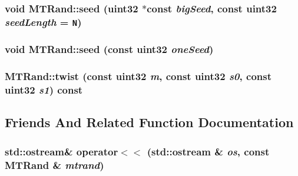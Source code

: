 \begin{CompactItemize}
\begin{CompactItemize}
\hypertarget{classMTRand_5758103776b131e8ea46b6dc1b9fb267}{
\subsubsection[{seed}]{\setlength{\rightskip}{0pt plus 5cm}void MTRand::seed ({\bf uint32} $\ast$const  {\em bigSeed}, \/  const {\bf uint32} {\em seedLength} = {\tt N})}}
\label{classMTRand_5758103776b131e8ea46b6dc1b9fb267}


\hypertarget{classMTRand_1e21a79e0a30225fffe924229e34a923}{
\subsubsection[{seed}]{\setlength{\rightskip}{0pt plus 5cm}void MTRand::seed (const {\bf uint32} {\em oneSeed})}}
\label{classMTRand_1e21a79e0a30225fffe924229e34a923}


\hypertarget{classMTRand_cf32530212717166e3d02dd3cc0b68c4}{
\subsubsection[{twist}]{ MTRand::twist (const {\bf uint32} {\em m}, \/  const {\bf uint32} {\em s0}, \/  const {\bf uint32} {\em s1}) const}}
\label{classMTRand_cf32530212717166e3d02dd3cc0b68c4}




\subsection{Friends And Related Function Documentation}
\hypertarget{classMTRand_059061d50a1e54ee3067d4e1dbdd7c64}{
\subsubsection[{operator$<$$<$}]{\setlength{\rightskip}{0pt plus 5cm}std::ostream\& operator$<$$<$ (std::ostream \& {\em os}, \/  const {\bf MTRand} \& {\em mtrand})}}
\label{classMTRand_059061d50a1e54ee3067d4e1dbdd7c64}



\end{CompactItemize}
\end{CompactItemize}
